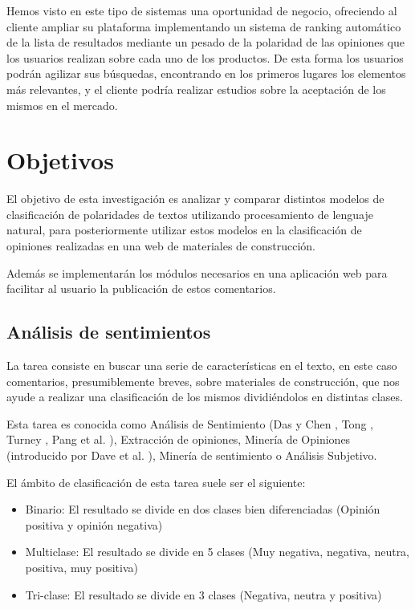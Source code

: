 Hemos visto en este tipo de sistemas una oportunidad de negocio, ofreciendo al cliente ampliar su plataforma implementando un sistema de ranking automático de la lista de resultados mediante un pesado de la polaridad de las opiniones que los usuarios realizan sobre cada uno de los productos. De esta forma los usuarios podrán agilizar sus búsquedas, encontrando en los primeros lugares los elementos más relevantes, y el cliente podría realizar estudios sobre la aceptación de los mismos en el mercado.

\section{Objetivos}

El objetivo de esta investigación es analizar y comparar distintos modelos de clasificación de polaridades de textos utilizando procesamiento de lenguaje natural, para posteriormente utilizar estos modelos en la clasificación de opiniones realizadas en una web de materiales de construcción.

Además se implementarán los módulos necesarios en una aplicación web para facilitar al usuario la publicación de estos comentarios.

\subsection{Análisis de sentimientos}

La tarea consiste en buscar una serie de características en el texto, en este caso comentarios, presumiblemente breves, sobre materiales de construcción, que nos ayude a realizar una clasificación de los mismos dividiéndolos en distintas clases.

Esta tarea es conocida como Análisis de Sentimiento (Das y Chen \cite{Das}, Tong \cite{Tong}, Turney \cite{Turney}, Pang et al. \cite{Pang}), Extracción de opiniones, Minería de Opiniones (introducido por Dave et al. \cite{Dave}), Minería de sentimiento o Análisis Subjetivo.

El ámbito de clasificación de esta tarea suele ser el siguiente:
\begin{itemize}
	\item Binario: El resultado se divide en dos clases bien diferenciadas (Opinión positiva y opinión negativa)
	\item Multiclase: El resultado se divide en 5 clases (Muy negativa, negativa, neutra, positiva, muy positiva)
	\item Tri-clase: El resultado se divide en 3 clases (Negativa, neutra y positiva)
\end{itemize}

